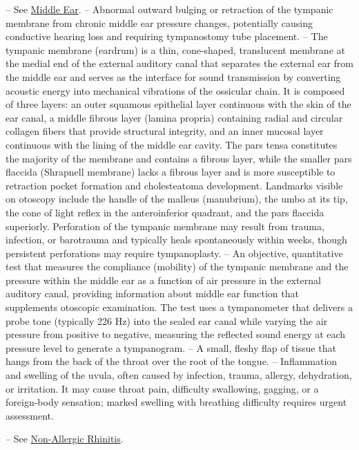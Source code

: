 -- See \hyperlink{Middle Ear}{Middle Ear}.
-- Abnormal outward bulging or retraction of the tympanic membrane from chronic middle ear pressure changes, potentially causing conductive hearing loss and requiring tympanostomy tube placement.
-- The tympanic membrane (eardrum) is a thin, cone-shaped, translucent membrane at the medial end of the external auditory canal that separates the external ear from the middle ear and serves as the interface for sound transmission by converting acoustic energy into mechanical vibrations of the ossicular chain. It is composed of three layers: an outer squamous epithelial layer continuous with the skin of the ear canal, a middle fibrous layer (lamina propria) containing radial and circular collagen fibers that provide structural integrity, and an inner mucosal layer continuous with the lining of the middle ear cavity. The pars tensa constitutes the majority of the membrane and contains a fibrous layer, while the smaller pars flaccida (Shrapnell membrane) lacks a fibrous layer and is more susceptible to retraction pocket formation and cholesteatoma development. Landmarks visible on otoscopy include the handle of the malleus (manubrium), the umbo at its tip, the cone of light reflex in the anteroinferior quadrant, and the pars flaccida superiorly. Perforation of the tympanic membrane may result from trauma, infection, or barotrauma and typically heals spontaneously within weeks, though persistent perforations may require tympanoplasty.
-- An objective, quantitative test that measures the compliance (mobility) of the tympanic membrane and the pressure within the middle ear as a function of air pressure in the external auditory canal, providing information about middle ear function that supplements otoscopic examination. The test uses a tympanometer that delivers a probe tone (typically 226 Hz) into the sealed ear canal while varying the air pressure from positive to negative, measuring the reflected sound energy at each pressure level to generate a tympanogram.
-- A small, fleshy flap of tissue that hangs from the back of the throat over the root of the tongue.
-- Inflammation and swelling of the uvula, often caused by infection, trauma, allergy, dehydration, or irritation. It may cause throat pain, difficulty swallowing, gagging, or a foreign-body sensation; marked swelling with breathing difficulty requires urgent assessment.

-- See \hyperlink{Non-Allergic Rhinitis}{Non-Allergic Rhinitis}.

